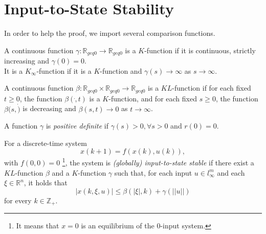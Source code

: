 \section{Input-to-State Stability}
\label{sec:iss}

In order to help the proof, we import several comparison functions.

\begin{mydef}[$ K $-function]
\label{def:k_func}
A continuous function $ \gamma : \mathbb{R}_{geq 0} \rightarrow \mathbb{R}_{geq 0} $ is a $ K $-function if it is continuous, strictly increasing and $ \gamma (0) = 0 $. \\
It is a $ K_{\infty} $-function if it is a $ K $-function and $ \gamma (s) \rightarrow \infty $ as $ s \rightarrow \infty $.
\end{mydef}

\begin{mydef}[KL-function]
\label{def:kl_func}
A continuous function $ \beta : \mathbb{R}_{geq 0} \times \mathbb{R}_{geq 0} \rightarrow \mathbb{R}_{geq 0} $ is a $ KL $-function if for each fixed $ t \geq 0 $, the function $ \beta ( \dot , t ) $ is a $ K $-function, and for each fixed $ s \geq 0 $, the function $ \beta ( s, \dot ) $ is decreasing and $ \beta (s, t) \rightarrow 0 $ as $ t \rightarrow \infty $.
\end{mydef}

\begin{mydef}
\label{def:pd_func}
A function $ \gamma $ is \emph{positive definite} if $ \gamma (s) > 0, \forall s > 0 $ and $ r(0)= 0 $.
\end{mydef}

\begin{mydef}\cite{Jiang2001857}
\label{def:iss}
For a discrete-time system
\begin{equation}
\label{eq:dis_nonlinear}
x(k+1) = f( x(k) , u(k) ),
\end{equation}
with $ f(0,0) = 0 $
\footnote{It means that $ x = 0 $ is an equilibrium of the 0-input system.}, the system is \emph{(globally) input-to-state stable} if there exist a $ KL $-function $ \beta  $ and a $ K $-function $ \gamma $ such that, for each input $ u \in l^{m}_{\infty} $ and each $ \xi \in \mathbb{R}^{n} $, it holds that
\begin{equation}
\label{eq:def_iss}
| x(k, \xi, u) | \leq \beta (| \xi |, k) + \gamma (|| u ||)
\end{equation}
for every $ k \in \mathbb{Z}_{+} $.
\end{mydef}

